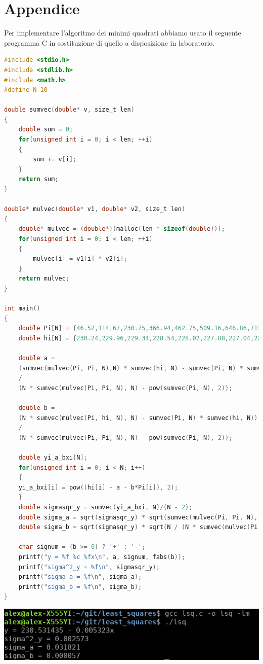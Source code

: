 \documentclass[10pt,a4paper]{book}
\begin{document}
\section*{Appendice}
Per implementare l'algoritmo dei minimi quadrati abbiamo usato il seguente programma C in sostituzione di quello a disposizione in laboratorio.
\begin{lstlisting}[language=C]
#include <stdio.h>
#include <stdlib.h>
#include <math.h>
#define N 10

double sumvec(double* v, size_t len)
{
	double sum = 0;
	for(unsigned int i = 0; i < len; ++i)
	{
		sum += v[i];
	}
	return sum;
}

double* mulvec(double* v1, double* v2, size_t len)
{
	double* mulvec = (double*)(malloc(len * sizeof(double)));
	for(unsigned int i = 0; i < len; ++i)
	{
		mulvec[i] = v1[i] * v2[i];
	}
	return mulvec;
}

int main()
{
	double Pi[N] = {46.52,114.67,230.75,366.94,462.75,509.16,646.86,713.49,829.50,925.29};
	double hi[N] = {230.24,229.96,229.34,228.54,228.02,227.88,227.04,226.78,226.16,225.56};

	double a = 
	(sumvec(mulvec(Pi, Pi, N),N) * sumvec(hi, N) - sumvec(Pi, N) * sumvec(mulvec(Pi, hi, N), N))
	/
	(N * sumvec(mulvec(Pi, Pi, N), N) - pow(sumvec(Pi, N), 2));

	double b = 
	(N * sumvec(mulvec(Pi, hi, N), N) - sumvec(Pi, N) * sumvec(hi, N))
	/
	(N * sumvec(mulvec(Pi, Pi, N), N) - pow(sumvec(Pi, N), 2));

	double yi_a_bxi[N];
	for(unsigned int i = 0; i < N; i++)
	{
	yi_a_bxi[i] = pow((hi[i] - a - b*Pi[i]), 2);
	}
	double sigmasqr_y = sumvec(yi_a_bxi, N)/(N - 2);
	double sigma_a = sqrt(sigmasqr_y) * sqrt(sumvec(mulvec(Pi, Pi, N), N) / (N * sumvec(mulvec(Pi, Pi, N), N) - pow(sumvec(Pi, N), 2)));
	double sigma_b = sqrt(sigmasqr_y) * sqrt(N / (N * sumvec(mulvec(Pi, Pi, N), N) - pow(sumvec(Pi, N), 2)));

	char signum = (b >= 0) ? '+' : '-';
	printf("y = %f %c %fx\n", a, signum, fabs(b));
	printf("sigma^2_y = %f\n", sigmasqr_y);
	printf("sigma_a = %f\n", sigma_a);
	printf("sigma_b = %f\n", sigma_b);
}
\end{lstlisting}
\begin{center}
\includegraphics[width=0.7\linewidth]{runlsq}
\end{center}
\end{document}
